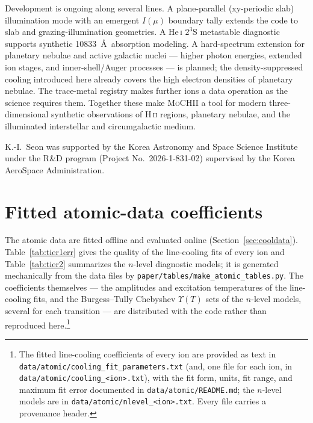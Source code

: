 \documentclass[twocolumn,linenumbers]{aastex702}
\newcommand{\code}[1]{\texttt{#1}}
\newcommand{\MoCHII}{\textsc{MoCHII}}
\newcommand{\HII}{H\,\textsc{ii}}
\begin{document}
Development is ongoing along several lines.  A plane-parallel
(xy-periodic slab) illumination mode with an emergent $I(\mu)$ boundary
tally extends the code to slab and grazing-illumination
geometries.  A He\,\textsc{i} $2^3$S metastable diagnostic supports
synthetic 10833~\AA\ absorption modeling.  A hard-spectrum extension for
planetary nebulae and active galactic nuclei --- higher photon energies,
extended ion stages, and inner-shell/Auger processes --- is planned; the
density-suppressed cooling introduced here already covers the high electron
densities of planetary nebulae.  The trace-metal registry makes further
ions a data operation as the science requires them.  Together these make
\MoCHII{} a tool for modern three-dimensional synthetic observations of
\HII{} regions, planetary nebulae, and the illuminated interstellar and
circumgalactic medium.

\begin{acknowledgments}
K.-I.\ Seon was supported by the Korea Astronomy and Space Science
Institute under the R\&D program (Project No.\ 2026-1-831-02) supervised by
the Korea AeroSpace Administration.
\end{acknowledgments}


\appendix

\section{Fitted atomic-data coefficients}
\label{app:atomic}

The atomic data are fitted offline and evaluated online
(Section~\ref{sec:cooldata}).  Table~\ref{tab:tier1err} gives the quality of
the line-cooling fits of every ion and Table~\ref{tab:tier2} summarizes the
$n$-level diagnostic models; it is generated mechanically from the data
files by \code{paper/tables/make\_atomic\_tables.py}.  The coefficients
themselves --- the amplitudes and excitation temperatures of the
line-cooling fits, and the Burgess--Tully Chebyshev $\Upsilon(T)$ sets of
the $n$-level models, several for each transition --- are distributed with
the code rather than reproduced here.\footnote{The fitted line-cooling
coefficients of every ion are provided as text in
\code{data/atomic/cooling\_fit\_parameters.txt} (and, one file for each ion,
in \code{data/atomic/cooling\_<ion>.txt}), with the fit form, units, fit
range, and maximum fit error documented in \code{data/atomic/README.md};
the $n$-level models are in \code{data/atomic/nlevel\_<ion>.txt}.  Every
file carries a provenance header.}
\end{document}
